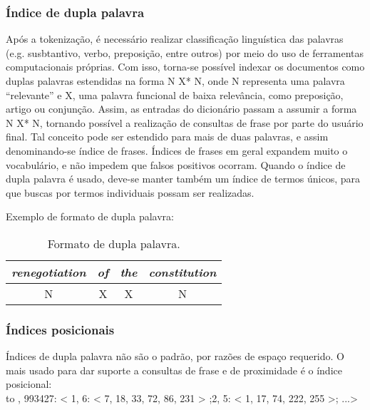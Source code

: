 \subsubsection{Índice de dupla palavra}

Após a tokenização, é necessário realizar classificação linguística das palavras (e.g. susbtantivo, verbo, preposição, entre outros) por meio do uso de ferramentas computacionais próprias. Com isso, torna-se possível indexar os documentos como duplas palavras estendidas na forma N X* N, onde N representa uma palavra ``relevante'' e X, uma palavra funcional de baixa relevância, como preposição, artigo ou conjunção. Assim, as entradas do dicionário passam a assumir a forma N X* N, tornando possível a realização de consultas de frase por parte do usuário final. Tal conceito pode ser estendido para mais de duas palavras, e assim denominando-se índice de frases. Índices de frases em geral expandem muito o vocabulário, e não impedem que falsos positivos ocorram. Quando o índice de dupla palavra é usado, deve-se manter também um índice de termos únicos, para que buscas por termos individuais possam ser realizadas.
 
Exemplo de formato de dupla palavra:

\begin{table}[!h]
	\centering
	\caption{Formato de dupla palavra.}
	\begin{tabular}{|c|c|c|c|}
		\hline
		\emph{renegotiation} & \emph{of} & \emph{the} & \emph{constitution} \\
		\hline
		N & X & X & N\\
		\hline 
		\end{tabular}
\end{table}

\subsubsection{Índices posicionais}

Índices de dupla palavra não são o padrão, por razões de espaço requerido. O mais usado para dar suporte a consultas de frase e de proximidade é o índice posicional: \\

%
%
to , 993427: < 1, 6: < 7, 18, 33, 72, 86, 231 > ;\hspace{0.4cm}2, 5: < 1, 17, 74, 222, 255 >; ...>\\

